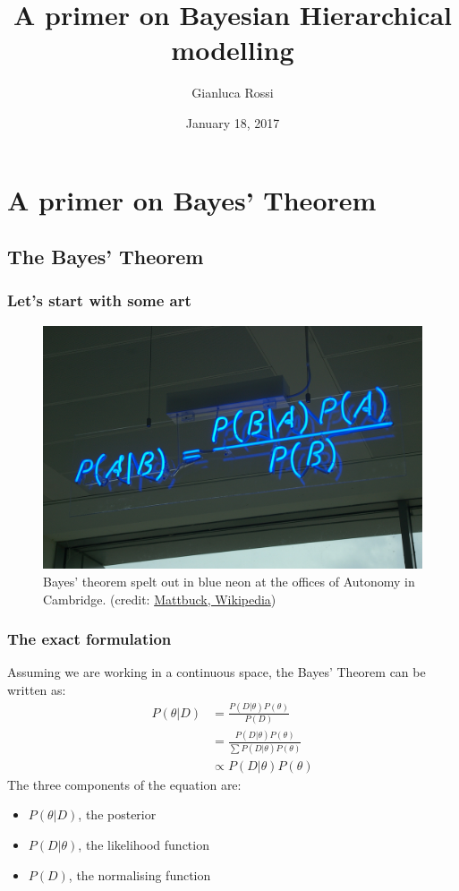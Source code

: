 \documentclass[11pt]{beamer}
\author{Gianluca Rossi}
\title{A primer on Bayesian Hierarchical modelling}
\date{January 18, 2017}
\begin{document}
\begin{frame}
	\titlepage
\end{frame}


\begin{frame}
	\tableofcontents
\end{frame}


\section{A primer on Bayes' Theorem}
\subsection{The Bayes' Theorem}
\begin{frame}
	\frametitle{Let's start with some art}
	\begin{figure}
		\includegraphics[scale=0.12]{./images/Bayes'_Theorem_MMB_01.jpg}
		\caption{Bayes' theorem spelt out in blue neon at the offices of Autonomy in Cambridge. (credit: \href{https://commons.wikimedia.org/wiki/User:Mattbuck}{Mattbuck, Wikipedia})}	
	\end{figure}
	
\end{frame}

\begin{frame}
	\frametitle{The exact formulation}
	Assuming we are working in a continuous space, the Bayes' Theorem can be written as:
	\begin{align}
		P(\theta | D) &= \frac{P(D | \theta) P(\theta)}{P(D)} \\
		&= \frac{P(D|\theta) P(\theta)}{\sum P(D | \theta) P(\theta)} \\
		&\propto P(D|\theta) P(\theta)
	\end{align}
	The three components of the equation are:
	\begin{itemize}
		\item $P(\theta | D)$, the posterior
		\item $P(D | \theta)$, the likelihood function
		\item $P(D)$, the normalising function
	\end{itemize}
\end{frame}
\end{document}

